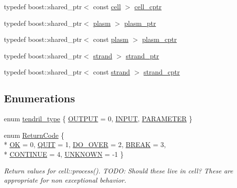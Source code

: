 \begin{DoxyCompactItemize}
\item 
typedef boost\+::shared\+\_\+ptr$<$ const \hyperlink{structecto_1_1cell}{cell} $>$ \hyperlink{namespaceecto_ab708c826226c91fd6f3c8c121f293a78}{cell\+\_\+cptr}
\item 
typedef boost\+::shared\+\_\+ptr$<$ \hyperlink{structecto_1_1plasm}{plasm} $>$ \hyperlink{namespaceecto_a6b83be6cd685db71f03b14871653475f}{plasm\+\_\+ptr}
\item 
typedef boost\+::shared\+\_\+ptr$<$ const \hyperlink{structecto_1_1plasm}{plasm} $>$ \hyperlink{namespaceecto_a5a9973f00c94e30353acb27c3d2fa836}{plasm\+\_\+cptr}
\item 
typedef boost\+::shared\+\_\+ptr$<$ \hyperlink{structecto_1_1strand}{strand} $>$ \hyperlink{namespaceecto_a98ca3b7b690de778292922c806e7588d}{strand\+\_\+ptr}
\item 
typedef boost\+::shared\+\_\+ptr$<$ const \hyperlink{structecto_1_1strand}{strand} $>$ \hyperlink{namespaceecto_abbad20d834739bbf762269e4e04a6732}{strand\+\_\+cptr}
\end{DoxyCompactItemize}
\subsection*{Enumerations}
\begin{DoxyCompactItemize}
\item 
enum \hyperlink{namespaceecto_a02939764b22968505f82e425c83272c2}{tendril\+\_\+type} \{ \hyperlink{namespaceecto_a02939764b22968505f82e425c83272c2a2a607ed53342989a455e71bf3a78cb08}{O\+U\+T\+P\+U\+T} = 0, 
\hyperlink{namespaceecto_a02939764b22968505f82e425c83272c2adf3175f3e2ad3637b6fca943b4cc7672}{I\+N\+P\+U\+T}, 
\hyperlink{namespaceecto_a02939764b22968505f82e425c83272c2a39346743c7a624185996a561642a9aaa}{P\+A\+R\+A\+M\+E\+T\+E\+R}
 \}
\item 
enum \hyperlink{namespaceecto_a93d82cd28db695d53963fb696582762c}{Return\+Code} \{ \\*
\hyperlink{namespaceecto_a93d82cd28db695d53963fb696582762ca047df8448e71f9fc10f4fe310b0a4de7}{O\+K} = 0, 
\hyperlink{namespaceecto_a93d82cd28db695d53963fb696582762ca6803dad912ff60afb751d630ba35f0b3}{Q\+U\+I\+T} = 1, 
\hyperlink{namespaceecto_a93d82cd28db695d53963fb696582762caa83c6c7678d27bc12006c6343229f841}{D\+O\+\_\+\+O\+V\+E\+R} = 2, 
\hyperlink{namespaceecto_a93d82cd28db695d53963fb696582762cab1a50eb818462b09d2aeed53db036ede}{B\+R\+E\+A\+K} = 3, 
\\*
\hyperlink{namespaceecto_a93d82cd28db695d53963fb696582762caa00c877a06d58c100c7b0788c6c38b0a}{C\+O\+N\+T\+I\+N\+U\+E} = 4, 
\hyperlink{namespaceecto_a93d82cd28db695d53963fb696582762caed3dfd705e16962aacd0ba04103fa6cc}{U\+N\+K\+N\+O\+W\+N} = -\/1
 \}
\begin{DoxyCompactList}\small\item\em Return values for cell\+::process(). T\+O\+D\+O\+: Should these live in cell? These are appropriate for non exceptional behavior. \end{DoxyCompactList}\end{DoxyCompactItemize}
